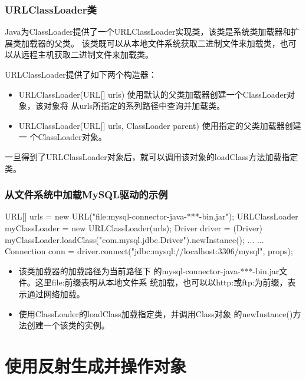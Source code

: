 \begin{frame}[fragile] %
\frametitle{URLClassLoader类}
Java为ClassLoader提供了一个URLClassLoader实现类，该类是系统类加载器和扩展类加载器的父类。
该类既可以从本地文件系统获取二进制文件来加载类，也可以从远程主机获取二进制文件来加载类。

URLClassLoader提供了如下两个构造器：

\begin{itemize}
\item URLClassLoader(URL[] urls) 使用默认的父类加载器创建一个ClassLoader对象，该对象将
  从urls所指定的系列路径中查询并加载类。
\item URLClassLoader(URL[] urls, ClassLoader parent) 使用指定的父类加载器创建一
  个ClassLoader对象。
\end{itemize}
一旦得到了URLClassLoader对象后，就可以调用该对象的loadClass方法加载指定类。
\end{frame}

\begin{frame}[fragile] %
\frametitle{从文件系统中加载MySQL驱动的示例}

\begin{javaCode}
URL[] urls = {new URL("file:mysql-connector-java-***-bin.jar")};
URLClassLoader myClassLoader = new URLClassLoader(urls);
Driver driver = (Driver) myClassLoader.loadClass("com.mysql.jdbc.Driver").newInstance();
... ...
Connection conn = driver.connect("jdbc:mysql://localhost:3306/mysql", props);
\end{javaCode}

\begin{itemize}\kai
\item 该类加载器的加载路径为当前路径下
  的mysql-connector-java-***-bin.jar文件。这里file:前缀表明从本地文件系
  统加载，也可以以http:或ftp:为前缀，表示通过网络加载。
\item 使用ClassLoader的loadClass加载指定类，并调用Class对象
  的newInstance()方法创建一个该类的实例。
\end{itemize}
\end{frame}




\section{使用反射生成并操作对象}

